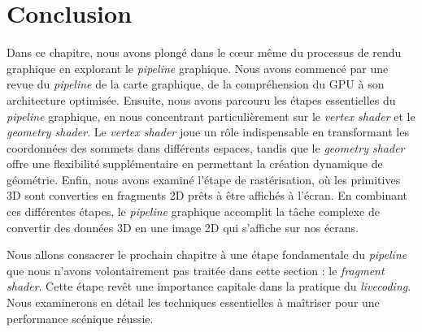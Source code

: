 \section{Conclusion}

Dans ce chapitre, nous avons plongé dans le cœur même du processus de rendu graphique en explorant le \textit{pipeline} graphique. Nous avons commencé par une revue du \textit{pipeline} de la carte graphique, de la compréhension du GPU à son architecture optimisée. Ensuite, nous avons parcouru les étapes essentielles du \textit{pipeline} graphique, en nous concentrant particulièrement sur le \textit{vertex shader} et le \textit{geometry shader}. Le \textit{vertex shader} joue un rôle indispensable en transformant les coordonnées des sommets dans différents espaces, tandis que le \textit{geometry shader} offre une flexibilité supplémentaire en permettant la création dynamique de géométrie. Enfin, nous avons examiné l'étape de rastérisation, où les primitives 3D sont converties en fragments 2D prêts à être affichés à l'écran. En combinant ces différentes étapes, le \textit{pipeline} graphique accomplit la tâche complexe de convertir des données 3D en une image 2D qui s'affiche sur nos écrans.

Nous allons consacrer le prochain chapitre à une étape fondamentale du \textit{pipeline} que nous n'avons volontairement pas traitée dans cette section : le \textit{fragment shader}. Cette étape revêt une importance capitale dans la pratique du \textit{livecoding}. Nous examinerons en détail les techniques essentielles à maîtriser pour une performance scénique réussie.







